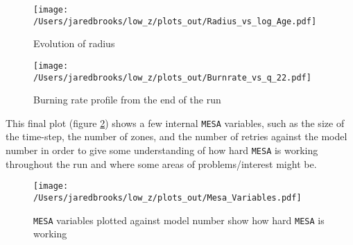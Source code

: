 \documentclass{article}
\begin{document}
        \begin{figure}[H]
          \begin{minipage}[b]{0.5\linewidth}
            \centering
            \texttt{[image: /Users/jaredbrooks/low\_z/plots\_out/Radius\_vs\_log\_Age.pdf]}
            \caption{Evolution of radius}
            \label{fig:5}
          \end{minipage}
          \hspace{0cm}
          \begin{minipage}[b]{0.5\linewidth}
            \centering
            \texttt{[image: /Users/jaredbrooks/low\_z/plots\_out/Burnrate\_vs\_q\_22.pdf]}
            \caption{Burning rate profile from the end of the run}
            \label{fig:6}
          \end{minipage}
        \end{figure}

        \pagebreak

        This final plot (figure \ref{fig:7}) shows a few internal \texttt{MESA} variables, such as the size of the time-step, the number of zones, and the number of retries against the model number in order to give some understanding of how hard \texttt{MESA} is working throughout the run and where some areas of problems/interest might be.

        \begin{figure}[H]
          \centering
          \texttt{[image: /Users/jaredbrooks/low\_z/plots\_out/Mesa\_Variables.pdf]}
          \caption{\texttt{MESA} variables plotted against model number show how hard \texttt{MESA} is working}
          \label{fig:7}
        \end{figure}
\end{document}
